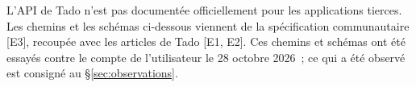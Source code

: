 L'API de Tado n'est pas documentée officiellement pour les applications tierces. Les chemins et les schémas ci-dessous viennent de la spécification communautaire [E3], recoupée avec les articles de Tado [E1, E2]. Ces chemins et schémas ont été essayés contre le compte de l'utilisateur le 28 octobre 2026~; ce qui a été observé est consigné au §\ref{sec:observations}.
